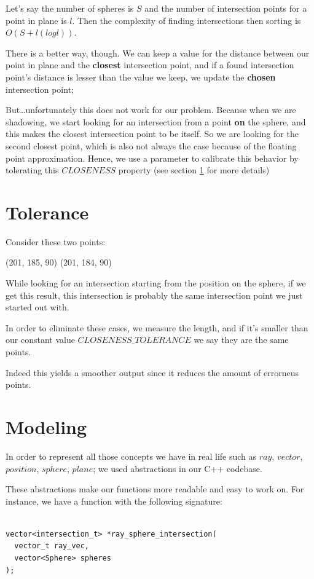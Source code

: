 \documentclass{article}
\begin{document}
Let's say the number of spheres is $S$ and the number of intersection points for a point in plane is $l$. Then the complexity of finding intersections then sorting is $O(S + l(logl))$.

There is a better way, though. We can keep a value for the distance between our point in plane and the \textbf{closest} intersection point, and if a found intersection point's distance is lesser than the value we keep, we update the \textbf{chosen} intersection point;

But\ldots unfortunately this does not work for our problem. Because when we are shadowing, we start looking for an intersection from a point \textbf{on} the sphere, and this makes the closest intersection point to be itself. So we are looking for the second closest point, which is also not always the case because of the floating point approximation. Hence, we use a parameter to calibrate this behavior by tolerating this $CLOSENESS$ property (see section \ref{tolerance} for more details)

\section{Tolerance}
\label{tolerance}
Consider these two points:

(201, 185, 90)
(201, 184, 90)

While looking for an intersection starting from the position on the sphere, if we get this result, this intersection is probably the same intersection point we just started out with.

In order to eliminate these cases, we measure the length, and if it's smaller than our constant value $CLOSENESS\_TOLERANCE$ we say they are the same points.

Indeed this yields a smoother output since it reduces the amount of errorneus points.

\section{Modeling}
\label{modeling}
In order to represent all those concepts we have in real life such as $ray$, $vector$, $position$, $sphere$, $plane$; we used abstractions in our C++ codebase.

These abstractions make our functions more readable and easy to work on. For instance, we have a function with the following signature:

\begin{lstlisting}[frame=single]  % Start your code-block

vector<intersection_t> *ray_sphere_intersection(
  vector_t ray_vec,
  vector<Sphere> spheres
);
\end{lstlisting}
\end{document}
